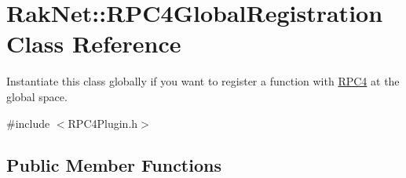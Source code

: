 \hypertarget{class_rak_net_1_1_r_p_c4_global_registration}{\section{Rak\-Net\-:\-:R\-P\-C4\-Global\-Registration Class Reference}
\label{class_rak_net_1_1_r_p_c4_global_registration}
}


Instantiate this class globally if you want to register a function with \hyperlink{class_rak_net_1_1_r_p_c4}{R\-P\-C4} at the global space.  




{\ttfamily \#include $<$R\-P\-C4\-Plugin.\-h$>$}

\subsection*{Public Member Functions}
